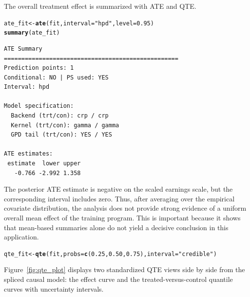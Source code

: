 \documentclass[article]{jss}\usepackage[]{graphicx}\usepackage[]{xcolor}
\makeatletter
\newcommand{\hlnum}[1]{\textcolor[rgb]{0.686,0.059,0.569}{#1}}%
\newcommand{\hlsng}[1]{\textcolor[rgb]{0.192,0.494,0.8}{#1}}%
\newcommand{\hldef}[1]{\textcolor[rgb]{0.345,0.345,0.345}{#1}}%
\newcommand{\hlkwb}[1]{\textcolor[rgb]{0.69,0.353,0.396}{#1}}%
\newcommand{\hlkwc}[1]{\textcolor[rgb]{0.333,0.667,0.333}{#1}}%
\newcommand{\hlkwd}[1]{\textcolor[rgb]{0.737,0.353,0.396}{\textbf{#1}}}%
\newenvironment{kframe}{%
 \def\at@end@of@kframe{}%
 \ifinner\ifhmode%
  \def\at@end@of@kframe{\end{minipage}}%
  \begin{minipage}{\columnwidth}%
 \fi\fi%
 \def\FrameCommand##1{\hskip\@totalleftmargin \hskip-\fboxsep
 \colorbox{shadecolor}{##1}\hskip-\fboxsep
     \hskip-\linewidth \hskip-\@totalleftmargin \hskip\columnwidth}%
 \MakeFramed {\advance\hsize-\width
   \@totalleftmargin\z@ \linewidth\hsize
   \@setminipage}}%
 {\par\unskip\endMakeFramed%
 \at@end@of@kframe}
\newenvironment{knitrout}{}{} %
\makeatother
\begin{document}
The overall treatment effect is summarized with ATE and QTE.

\begin{knitrout}\footnotesize
{}\color{fgcolor}\begin{kframe}
\begin{alltt}
\hldef{ate_fit} \hlkwb{<-} \hlkwd{ate}\hldef{(fit,} \hlkwc{interval} \hldef{=} \hlsng{"hpd"}\hldef{,} \hlkwc{level} \hldef{=} \hlnum{0.95}\hldef{)}
\hlkwd{summary}\hldef{(ate_fit)}
\end{alltt}
\begin{verbatim}
ATE Summary
================================================== 
Prediction points: 1
Conditional: NO | PS used: YES
Interval: hpd

Model specification:
  Backend (trt/con): crp / crp
  Kernel (trt/con): gamma / gamma
  GPD tail (trt/con): YES / YES

ATE estimates:
 estimate  lower upper
   -0.766 -2.992 1.358
\end{verbatim}
\end{kframe}
\end{knitrout}

The posterior ATE estimate is negative on the scaled earnings scale,
but the corresponding interval includes zero. Thus, after averaging
over the empirical covariate distribution, the analysis does not
provide strong evidence of a uniform overall mean effect of the
training program. This is important because it shows that mean-based
summaries alone do not yield a decisive conclusion in this application.

\begin{knitrout}\footnotesize
{}\color{fgcolor}\begin{kframe}
\begin{alltt}
\hldef{qte_fit} \hlkwb{<-} \hlkwd{qte}\hldef{(fit,} \hlkwc{probs} \hldef{=} \hlkwd{c}\hldef{(}\hlnum{0.25}\hldef{,} \hlnum{0.50}\hldef{,} \hlnum{0.75}\hldef{),} \hlkwc{interval} \hldef{=} \hlsng{"credible"}\hldef{)}
\end{alltt}
\end{kframe}
\end{knitrout}

Figure~\ref{fig:qte_plot} displays two standardized QTE views side by
side from the spliced causal model: the effect curve and the
treated-versus-control quantile curves with uncertainty intervals.
\end{document}
